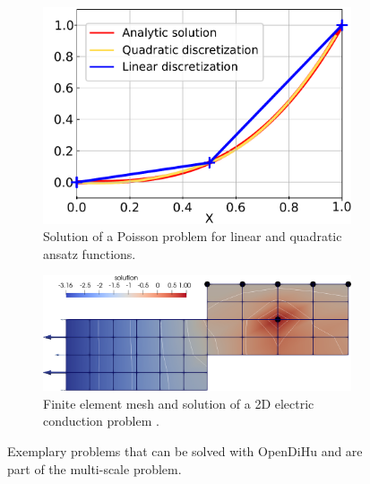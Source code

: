 \begin{figure}
  \centering%
  \begin{subfigure}[t]{0.38\textwidth}%
    \centering%
    \includegraphics[width=\textwidth]{images/results/basic/analytic.pdf}%
    \caption{Solution of a Poisson problem for linear and quadratic ansatz functions.}%
    \label{fig:poisson}%
  \end{subfigure}\quad
  \begin{subfigure}[t]{0.58\textwidth}%
    \centering%
    \includegraphics[width=\textwidth]{images/results/basic/laplace_composite_1.png}%
    \caption{Finite element mesh and solution of a 2D electric conduction problem .}%
    \label{fig:laplace_composite_1}%
  \end{subfigure}
  \caption{Exemplary problems that can be solved with OpenDiHu and are part of the multi-scale problem.}%
  \label{fig:poisson_laplace_composite_1}%
\end{figure}%

